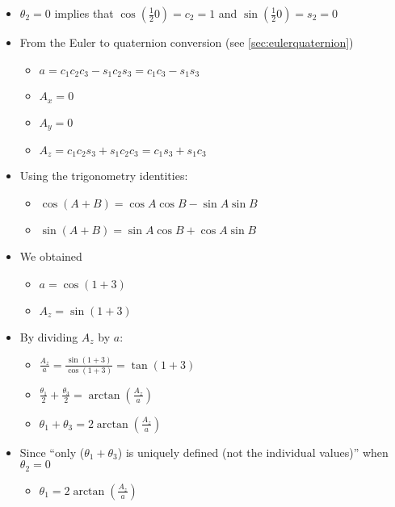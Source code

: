 \documentclass[letterpaper]{article}
\begin{document}
\begin{itemize}
\begin{itemize}
\begin{enumerate}
\begin{itemize}
\begin{itemize}
									\end{itemize}
								\item $\theta_2 = 0$ implies that $\cos{\left(\frac{1}{2} 0\right)} = c_2 = 1$ and $\sin{\left(\frac{1}{2} 0\right)} = s_2 = 0$
								\item From the Euler to quaternion conversion (see \ref{sec:eulerquaternion})
									\begin{itemize}
										\item $a = c_1c_2c_3 - s_1c_2s_3 = c_1c_3 - s_1s_3$
										\item $A_x = 0$
										\item $A_y = 0$
										\item $A_z = c_1c_2s_3 + s_1c_2c_3 = c_1s_3 + s_1c_3$
									\end{itemize}
								\item Using the trigonometry identities:
									\begin{itemize}
										\item $\cos{\left(A+B\right)} = \cos{A}\cos{B} - \sin{A}\sin{B}$
										\item $\sin{\left(A+B\right)} = \sin{A}\cos{B} + \cos{A}\sin{B}$
									\end{itemize}
								\item We obtained
									\begin{itemize}
										\item $a = \cos{\left(1+3\right)}$
										\item $A_z = \sin{\left(1+3\right)}$
									\end{itemize}
								\item By dividing $A_z$ by $a$:
									\begin{itemize}
										\item $\frac{A_z}{a} = \frac{\sin{\left(1+3\right)}}{\cos{\left(1+3\right)}} = \tan{\left(1+3\right)}$
										\item $\frac{\theta_1}{2} + \frac{\theta_3}{2} = \arctan{\left(\frac{A_z}{a}\right)}$
										\item $\theta_1 + \theta_3 = 2\arctan{\left(\frac{A_z}{a}\right)}$
									\end{itemize}
								\item Since ``only ($\theta_1 + \theta_3$) is uniquely defined (not the individual values)''\cite{Wikipedia2008e} when $\theta_2 = 0$
									\begin{itemize}
										\item $\theta_1 = 2\arctan{\left(\frac{A_z}{a}\right)}$

\end{itemize}
\end{itemize}
\end{enumerate}
\end{itemize}
\end{itemize}
\end{document}
